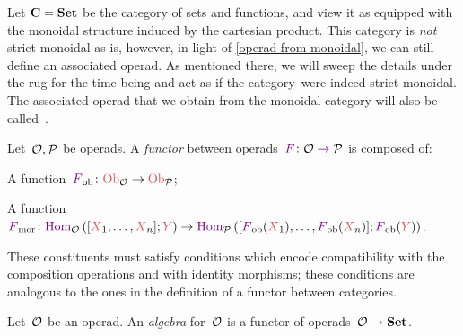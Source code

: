 \begin{example}
    Let $\mathbf{C} = \mathbf{Set}$ be the category of sets and functions, and view it as equipped with the monoidal structure induced by the cartesian product.
    This category is \emph{not} strict monoidal as is, however, in light of \cref{operad-from-monoidal}, we can still define an associated operad.
    As mentioned there, we will sweep the details under the rug for the time-being and act as if the category~\Set were indeed strict monoidal.
    The associated operad that we obtain from the monoidal category \Set will also be called~\Set.
\end{example}

\begin{ctdefinition}
    \label{def:functors_operads}
    Let~$\mathcal{O},\mathcal{P}$ be operads.
    A \emph{functor} between operads~$\funa\colon \operada \fto \operadb$  is composed of:
    \begin{compactenum}
        \item A function~$\funaob\colon \Ob_\operada\to \Ob_\operadb$;
        \item A function~$\funamor\colon \HomSet{\operada}{[\Obja_1,\ldots,\Obja_n]}{\Objb}\to \HomSet{\operadb}{[\funaob(\Obja_1),\ldots, \funaob(\Obja_n)]}{\funaob(\Objb)}$.
    \end{compactenum}
    These constituents must satisfy conditions which encode compatibility with the composition operations and with identity morphisms; these conditions are analogous to the ones in the definition of a functor between categories.
\end{ctdefinition}


\begin{definition}
    \label{def:algebra_operad}
    Let~$\mathcal{O}$ be an operad.
    An \emph{algebra} for~$\mathcal{O}$ is a functor of operads~$\operada \fto \Set$.
\end{definition}


